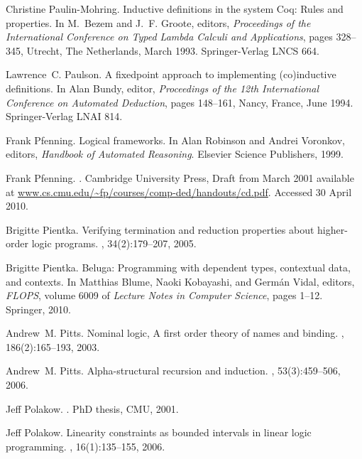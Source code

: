 \documentclass[final]{svjour3}
\begin{document}
\begin{thebibliography}{100}
Christine Paulin-Mohring.
\newblock Inductive definitions in the system {Coq}: Rules and properties.
\newblock In M.~Bezem and J.~F. Groote, editors, {\em Proceedings of the
  International Conference on Typed Lambda Calculi and Applications}, pages
  328--345, Utrecht, The Netherlands, March 1993. Springer-Verlag LNCS 664.

Lawrence~C. Paulson.
\newblock A fixedpoint approach to implementing (co)inductive definitions.
\newblock In Alan Bundy, editor, {\em Proceedings of the 12th International
  Conference on Automated Deduction}, pages 148--161, Nancy, France, June 1994.
  Springer-Verlag LNAI 814.

Frank Pfenning.
\newblock Logical frameworks.
\newblock In Alan Robinson and Andrei Voronkov, editors, {\em Handbook of
  Automated Reasoning}. Elsevier Science Publishers, 1999.

Frank Pfenning.
.
\newblock Cambridge University Press, Draft from March 2001 available at
  \url{www.cs.cmu.edu/~fp/courses/comp-ded/handouts/cd.pdf}.
\newblock Accessed 30 April 2010.

Brigitte Pientka.
\newblock Verifying termination and reduction properties about higher-order
  logic programs.
, 34(2):179--207, 2005.

Brigitte Pientka.
\newblock Beluga: Programming with dependent types, contextual data, and
  contexts.
\newblock In Matthias Blume, Naoki Kobayashi, and Germ{\'a}n Vidal, editors,
  {\em FLOPS}, volume 6009 of {\em Lecture Notes in Computer Science}, pages
  1--12. Springer, 2010.

Andrew~M. Pitts.
\newblock Nominal logic, {A} first order theory of names and binding.
, 186(2):165--193, 2003.

Andrew~M. Pitts.
\newblock Alpha-structural recursion and induction.
, 53(3):459--506, 2006.

Jeff Polakow.
.
\newblock PhD thesis, CMU, 2001.

Jeff Polakow.
\newblock Linearity constraints as bounded intervals in linear logic
  programming.
, 16(1):135--155, 2006.


\end{thebibliography}
\end{document}
